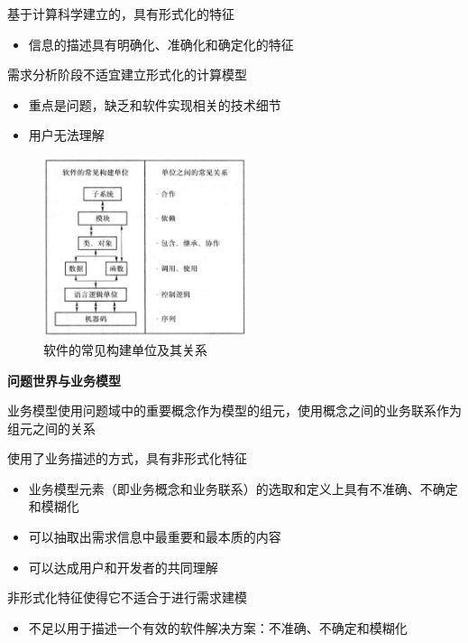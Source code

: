 基于计算科学建立的，具有形式化的特征
\begin{itemize}
    \item 信息的描述具有明确化、准确化和确定化的特征
\end{itemize}

需求分析阶段不适宜建立形式化的计算模型
\vspace{-0.8em}
\begin{multicols}{2}
    \begin{itemize}
        \item 重点是问题，缺乏和软件实现相关的技术细节
        \item 用户无法理解
    \end{itemize}
\end{multicols}
\vspace{-1em}

\begin{figure}[H]
	\centering
    \vspace{-0.5em}
	\includegraphics[width=0.53\textwidth]{img/软件的常见构建单位及其关系.png}
    \caption*{软件的常见构建单位及其关系}
    \vspace{-1em}
\end{figure}


\textbf{问题世界与业务模型} \par
业务模型使用问题域中的重要概念作为模型的组元，使用概念之间的业务联系作为组元之间的关系

使用了业务描述的方式，具有非形式化特征
\begin{itemize}
    \item 业务模型元素（即业务概念和业务联系）的选取和定义上具有不准确、不确定和模糊化
    \item 可以抽取出需求信息中最重要和最本质的内容
    \item 可以达成用户和开发者的共同理解
\end{itemize}

非形式化特征使得它不适合于进行需求建模
\begin{itemize}
    \item 不足以用于描述一个有效的软件解决方案：不准确、不确定和模糊化
\end{itemize}


